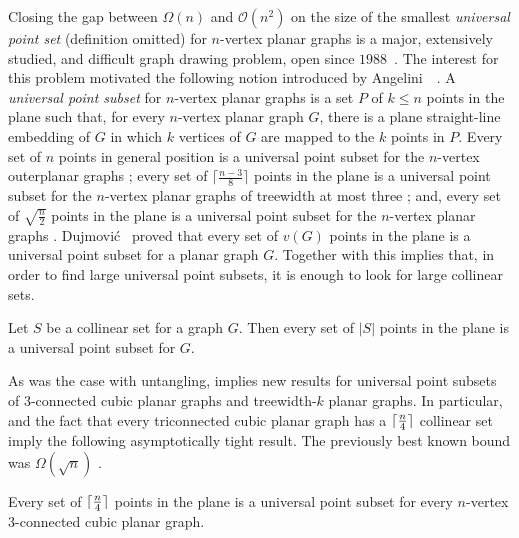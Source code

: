 Closing the gap between $\Omega(n)$ and $\mathcal{O}(n^2)$ on the size of the
smallest \emph{universal point set} (definition omitted) for $n$-vertex planar graphs is a major, extensively studied, and difficult graph
drawing problem, open since $1988$~\cite{deFraysseix:1988:SSS:62212.62254, dFPP90, DBLP:journals/ipl/Kurowski04, DBLP:journals/jgaa/BannisterCDE14}. The interest for this problem motivated the following notion introduced by Angelini~\etal~\cite{abehlmmo-ups-12}. 
A \emph{universal point subset} for  $n$-vertex planar graphs is a
set $P$ of $k\leq n$ points in the plane such that, for every
$n$-vertex planar graph $G$, there is a plane straight-line
embedding of $G$ in which $k$ vertices of $G$ are mapped to the $k$
points in $P$. Every set of $n$ points in general position is a
universal point subset for the $n$-vertex outerplanar graphs
\cite{GMPP,DBLP:journals/comgeo/Bose02,DBLP:conf/cccg/CastanedaU96};  every
set of $\lceil \frac{n-3}{8}\rceil$ points in the plane is a universal
point subset for the $n$-vertex planar graphs of treewidth at most
three \cite{dalozzo.dujmovic.ea:drawing}; and, every set of $\sqrt{\frac{n}{2}}$ points in the plane is a universal point
subset for the $n$-vertex planar graphs \cite{dujmovic:utility}. Dujmovi\'c~\cite{dujmovic:utility}
  proved that every set of $v(G)$ points in the plane is a universal point subset
  for a planar graph $G$. Together with  this implies
  that, in order to find large universal point subsets, it is enough to look for large collinear sets.

\begin{thm}
Let $S$ be a collinear set for a graph $G$. Then every set of $|S|$ points in the
plane is a universal point subset for $G$.
\end{thm}

As was the case with untangling,  implies new results for universal point subsets of 3-connected cubic planar graphs and treewidth-$k$ planar graphs. In particular,  and the fact that every triconnected cubic planar graph has
a ${\lceil \frac{n}{4} \rceil}$  collinear set \cite{dalozzo.dujmovic.ea:drawing} imply
the following asymptotically tight result. The previously best known
bound was $\Omega(\sqrt{n})$ \cite{dujmovic:utility}.

\begin{cor}
Every set of ${\lceil \frac{n}{4} \rceil}$ points in the plane  is a universal
point subset for  every $n$-vertex 3-connected cubic
planar graph.
\end{cor}


